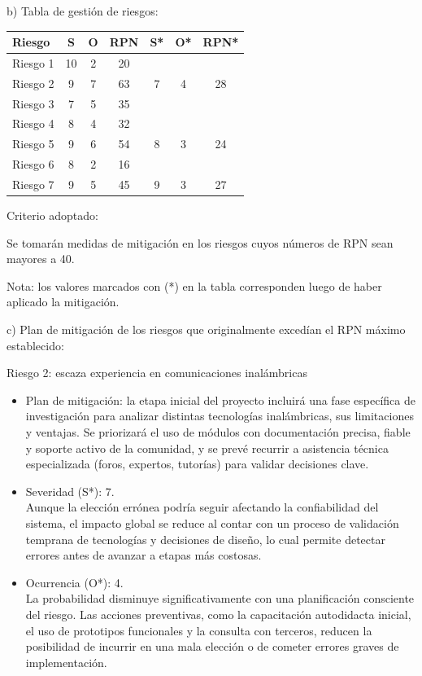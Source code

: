 \documentclass[
11pt, %
]{charter}
\begin{document}
\newpage
b) Tabla de gestión de riesgos:

\begin{table}[htpb]
\centering
\begin{tabularx}{\linewidth}{@{}|X|c|c|c|c|c|c|@{}}
\hline
\rowcolor[HTML]{C0C0C0} 
Riesgo		& S  & O  & RPN & S* & O* & RPN* \\ \hline
Riesgo 1	& 10 & 2  & 20  &    &    &      \\ \hline
Riesgo 2	& 9  & 7  & 63  & 7  & 4  & 28   \\ \hline
Riesgo 3	& 7  & 5  & 35  &    &    &      \\ \hline
Riesgo 4	& 8  & 4  & 32  &    &    &      \\ \hline
Riesgo 5	& 9  & 6  & 54  & 8  & 3  & 24   \\ \hline
Riesgo 6	& 8  & 2  & 16  &    &    &      \\ \hline
Riesgo 7	& 9  & 5  & 45  & 9  & 3  & 27   \\ \hline
\end{tabularx}%
\end{table}

Criterio adoptado: 

Se tomarán medidas de mitigación en los riesgos cuyos números de RPN sean mayores a 40.

Nota: los valores marcados con (*) en la tabla corresponden luego de haber aplicado la mitigación.

c) Plan de mitigación de los riesgos que originalmente excedían el RPN máximo establecido:
 
Riesgo 2: escaza experiencia en comunicaciones inalámbricas
  \begin{itemize}
  	\item Plan de mitigación: la etapa inicial del proyecto incluirá una fase específica de investigación para analizar distintas tecnologías inalámbricas, sus limitaciones y ventajas. Se priorizará el uso de módulos con documentación precisa, fiable y soporte activo de la comunidad, y se prevé recurrir a asistencia técnica especializada (foros, expertos, tutorías) para validar decisiones clave.
	\item Severidad (S*): 7. \\ Aunque la elección errónea podría seguir afectando la confiabilidad del sistema, el impacto global se reduce al contar con un proceso de validación temprana de tecnologías y decisiones de diseño, lo cual permite detectar errores antes de avanzar a etapas más costosas.
	\item Ocurrencia (O*): 4. \\ La probabilidad disminuye significativamente con una planificación consciente del riesgo. Las acciones preventivas, como la capacitación autodidacta inicial, el uso de prototipos funcionales y la consulta con terceros, reducen la posibilidad de incurrir en una mala elección o de cometer errores graves de implementación.
	\end{itemize}
	
\end{document}

